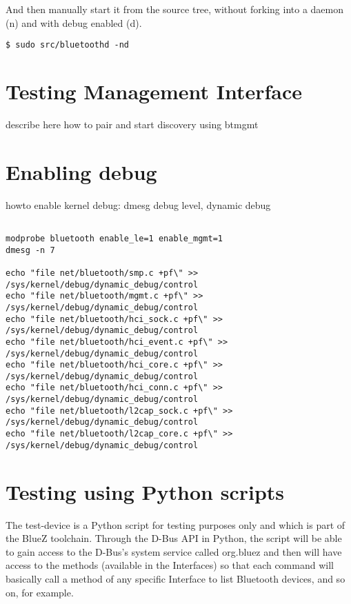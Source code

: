 \documentclass[11pt]{article}
\begin{document}
And then manually start it from the source tree, without forking into a daemon
(n) and with debug enabled (d).

\begin{verbatim}
$ sudo src/bluetoothd -nd
\end{verbatim}

\section{Testing Management Interface}

describe here how to pair and start discovery using btmgmt


\section{Enabling debug}

howto enable kernel debug: dmesg debug level, dynamic debug

\begin{verbatim}

modprobe bluetooth enable_le=1 enable_mgmt=1
dmesg -n 7

echo "file net/bluetooth/smp.c +pf\" >> /sys/kernel/debug/dynamic_debug/control
echo "file net/bluetooth/mgmt.c +pf\" >> /sys/kernel/debug/dynamic_debug/control
echo "file net/bluetooth/hci_sock.c +pf\" >> /sys/kernel/debug/dynamic_debug/control
echo "file net/bluetooth/hci_event.c +pf\" >> /sys/kernel/debug/dynamic_debug/control
echo "file net/bluetooth/hci_core.c +pf\" >> /sys/kernel/debug/dynamic_debug/control
echo "file net/bluetooth/hci_conn.c +pf\" >> /sys/kernel/debug/dynamic_debug/control
echo "file net/bluetooth/l2cap_sock.c +pf\" >> /sys/kernel/debug/dynamic_debug/control
echo "file net/bluetooth/l2cap_core.c +pf\" >> /sys/kernel/debug/dynamic_debug/control
\end{verbatim}

\section{Testing using Python scripts}

The test-device is a Python script for testing purposes only and which is part
of the BlueZ toolchain. Through the D-Bus API in Python, the script
will be able to gain access to the D-Bus's system service called
org.bluez and then will have access to the methods (available in the
Interfaces) so that each command will basically call a method of any
specific Interface to list Bluetooth devices, and so on, for example.
\end{document}

